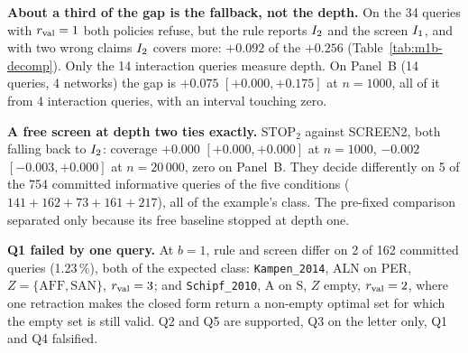 \textbf{About a third of the gap is the fallback, not the depth.} On the 34 queries with $r_{\mathrm{val}} = 1$
both policies refuse, but the rule reports $I_{2}$ and the screen $I_{1}$, and with two wrong claims
$I_{2}$ covers more: $+0.092$ of the $+0.256$ (Table~\ref{tab:m1b-decomp}). Only the 14 interaction
queries measure depth. On Panel~B (14 queries, 4 networks) the gap is $+0.075$ $[+0.000, +0.175]$ at
$n = 1000$, all of it from 4 interaction queries, with an interval touching zero.

\textbf{A free screen at depth two ties exactly.} $\mathrm{STOP}_2$ against SCREEN2, both falling back
to $I_{2}$: coverage $+0.000$ $[+0.000, +0.000]$ at $n = 1000$, $-0.002$ $[-0.003, +0.000]$ at
$n = 20\,000$, zero on Panel~B. They decide differently on 5 of the 754 committed informative queries of
the five conditions ($141 + 162 + 73 + 161 + 217$), all of the example's class. The pre-fixed
comparison separated only because its free baseline stopped at depth one.

\textbf{Q1 failed by one query.} At $b = 1$, rule and screen differ on 2 of 162 committed queries
(1.23\,\%), both of the expected class: \texttt{Kampen\_2014}, ALN on PER, $Z = \{\mathrm{AFF},
\mathrm{SAN}\}$, $r_{\mathrm{val}} = 3$; and \texttt{Schipf\_2010}, A on S, $Z$ empty, $r_{\mathrm{val}} = 2$, where one
retraction makes the closed form return a non-empty optimal set for which the empty set is still valid.
Q2 and Q5 are supported, Q3 on the letter only, Q1 and Q4 falsified.


\begin{antes}
\end{antes}


